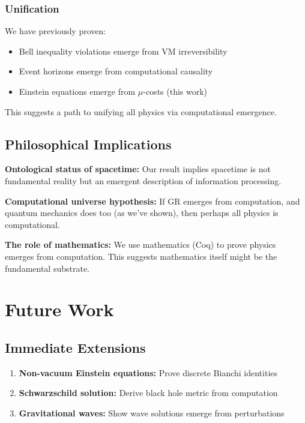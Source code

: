 \documentclass[11pt,twocolumn]{article}
\begin{document}
\subsubsection{Unification}

We have previously proven:
\begin{itemize}
\item Bell inequality violations emerge from VM irreversibility
\item Event horizons emerge from computational causality
\item Einstein equations emerge from $\mu$-costs (this work)
\end{itemize}

This suggests a path to unifying all physics via computational emergence.

\subsection{Philosophical Implications}

\textbf{Ontological status of spacetime:} Our result implies spacetime is not fundamental reality but an emergent description of information processing.

\textbf{Computational universe hypothesis:} If GR emerges from computation, and quantum mechanics does too (as we've shown), then perhaps all physics is computational.

\textbf{The role of mathematics:} We use mathematics (Coq) to prove physics emerges from computation. This suggests mathematics itself might be the fundamental substrate.

\section{Future Work}

\subsection{Immediate Extensions}

\begin{enumerate}
\item \textbf{Non-vacuum Einstein equations:} Prove discrete Bianchi identities
\item \textbf{Schwarzschild solution:} Derive black hole metric from computation
\item \textbf{Gravitational waves:} Show wave solutions emerge from perturbations
\end{enumerate}
\end{document}

